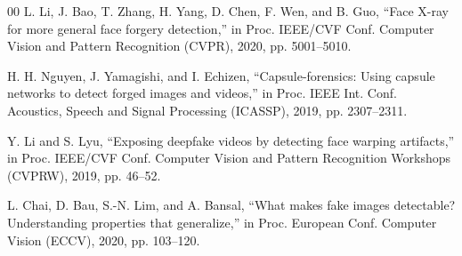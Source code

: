 \documentclass[conference]{IEEEtran}
\begin{document}
\begin{thebibliography}{00}
 L. Li, J. Bao, T. Zhang, H. Yang, D. Chen, F. Wen, and B. Guo, ``Face X-ray for more general face forgery detection,'' in Proc. IEEE/CVF Conf. Computer Vision and Pattern Recognition (CVPR), 2020, pp. 5001--5010.

 H. H. Nguyen, J. Yamagishi, and I. Echizen, ``Capsule-forensics: Using capsule networks to detect forged images and videos,'' in Proc. IEEE Int. Conf. Acoustics, Speech and Signal Processing (ICASSP), 2019, pp. 2307--2311.

 Y. Li and S. Lyu, ``Exposing deepfake videos by detecting face warping artifacts,'' in Proc. IEEE/CVF Conf. Computer Vision and Pattern Recognition Workshops (CVPRW), 2019, pp. 46--52.

 L. Chai, D. Bau, S.-N. Lim, and A. Bansal, ``What makes fake images detectable? Understanding properties that generalize,'' in Proc. European Conf. Computer Vision (ECCV), 2020, pp. 103--120.

\end{thebibliography}
\end{document}

